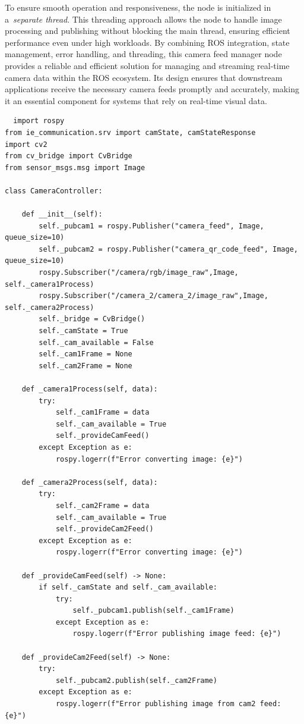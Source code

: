 \documentclass[a4paper,12pt]{extreport}
\begin{document}
To ensure smooth operation and responsiveness, the node is initialized
in a~\emph{separate thread}. This threading approach allows the node to
handle image processing and publishing without blocking the main thread,
ensuring efficient performance even under high workloads. By combining
ROS integration, state management, error handling, and threading, this
camera feed manager node provides a reliable and efficient solution for
managing and streaming real-time camera data within the ROS ecosystem.
Its design ensures that downstream applications receive the necessary
camera feeds promptly and accurately, making it an essential component
for systems that rely on real-time visual data.


  \begin{verbatim}
  import rospy
from ie_communication.srv import camState, camStateResponse
import cv2
from cv_bridge import CvBridge
from sensor_msgs.msg import Image

class CameraController:

    def __init__(self):
        self._pubcam1 = rospy.Publisher("camera_feed", Image, queue_size=10)
        self._pubcam2 = rospy.Publisher("camera_qr_code_feed", Image, queue_size=10)
        rospy.Subscriber("/camera/rgb/image_raw",Image, self._camera1Process)
        rospy.Subscriber("/camera_2/camera_2/image_raw",Image, self._camera2Process)
        self._bridge = CvBridge()
        self._camState = True
        self._cam_available = False
        self._cam1Frame = None
        self._cam2Frame = None

    def _camera1Process(self, data):
        try:
            self._cam1Frame = data
            self._cam_available = True
            self._provideCamFeed()
        except Exception as e:
            rospy.logerr(f"Error converting image: {e}")

    def _camera2Process(self, data):
        try:
            self._cam2Frame = data
            self._cam_available = True
            self._provideCam2Feed()
        except Exception as e:
            rospy.logerr(f"Error converting image: {e}")

    def _provideCamFeed(self) -> None:
        if self._camState and self._cam_available:
            try:
                self._pubcam1.publish(self._cam1Frame)
            except Exception as e:
                rospy.logerr(f"Error publishing image feed: {e}")

    def _provideCam2Feed(self) -> None:
        try:
            self._pubcam2.publish(self._cam2Frame)
        except Exception as e:
            rospy.logerr(f"Error publishing image from cam2 feed: {e}")
\end{verbatim}
\label{judFig22}
\end{document}
